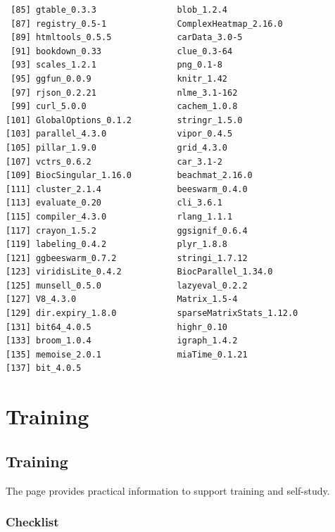 \documentclass[
]{book}
\begin{document}
\begin{verbatim}
 [85] gtable_0.3.3                blob_1.2.4                 
 [87] registry_0.5-1              ComplexHeatmap_2.16.0      
 [89] htmltools_0.5.5             carData_3.0-5              
 [91] bookdown_0.33               clue_0.3-64                
 [93] scales_1.2.1                png_0.1-8                  
 [95] ggfun_0.0.9                 knitr_1.42                 
 [97] rjson_0.2.21                nlme_3.1-162               
 [99] curl_5.0.0                  cachem_1.0.8               
[101] GlobalOptions_0.1.2         stringr_1.5.0              
[103] parallel_4.3.0              vipor_0.4.5                
[105] pillar_1.9.0                grid_4.3.0                 
[107] vctrs_0.6.2                 car_3.1-2                  
[109] BiocSingular_1.16.0         beachmat_2.16.0            
[111] cluster_2.1.4               beeswarm_0.4.0             
[113] evaluate_0.20               cli_3.6.1                  
[115] compiler_4.3.0              rlang_1.1.1                
[117] crayon_1.5.2                ggsignif_0.6.4             
[119] labeling_0.4.2              plyr_1.8.8                 
[121] ggbeeswarm_0.7.2            stringi_1.7.12             
[123] viridisLite_0.4.2           BiocParallel_1.34.0        
[125] munsell_0.5.0               lazyeval_0.2.2             
[127] V8_4.3.0                    Matrix_1.5-4               
[129] dir.expiry_1.8.0            sparseMatrixStats_1.12.0   
[131] bit64_4.0.5                 highr_0.10                 
[133] broom_1.0.4                 igraph_1.4.2               
[135] memoise_2.0.1               miaTime_0.1.21             
[137] bit_4.0.5                  
\end{verbatim}

\hypertarget{part-training}{%
\part{Training}\label{part-training}}

\hypertarget{training}{%
\chapter{Training}\label{training}}

The page provides practical information to support training and self-study.

\hypertarget{checklist}{%
\section{Checklist}\label{checklist}}
\end{document}
